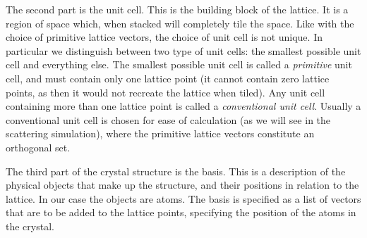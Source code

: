 \documentclass[main.tex]{subfiles}
\begin{document}
	The second part is the unit cell. This is the building block of the lattice. It is a region of space which, when stacked will completely tile the space. Like with the choice of primitive lattice vectors, the choice of unit cell is not unique. In particular we distinguish between two type of unit cells: the smallest possible unit cell and everything else. The smallest possible unit cell is called a \textit{primitive} unit cell, and must contain only one lattice point (it cannot contain zero lattice points, as then it would not recreate the lattice when tiled). Any unit cell containing more than one lattice point is called a \textit{conventional unit cell}. Usually a conventional unit cell is chosen for ease of calculation (as we will see in the scattering simulation), where the primitive lattice vectors constitute an orthogonal set.
	
	The third part of the crystal structure is the basis. This is a description of the physical objects that make up the structure, and their positions in relation to the lattice. In our case the objects are atoms. The basis is specified as a list of vectors that are to be added to the lattice points, specifying the position of the atoms in the crystal.
	
\end{document}
